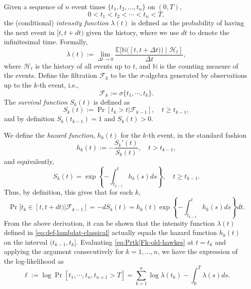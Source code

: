 \documentclass[11pt]{article}
\newcommand{\yao}[1]{\textcolor{cyan}{\textsf{#1}}}
\newcommand{\xc}[1]{\textcolor{orange}{\textsf{XC: #1}}}
\theoremstyle{remark}
\theoremstyle{plain}
\newcommand{\calH}{\mathcal{H}}
\newcommand{\calF}{\mathcal{F}}
\newcommand{\E}{\mathbb{E}}
\begin{document}
Given a sequence of $n$ event times $\{t_1, t_2, \ldots, t_n\}$ on $ (0,T)$,
\[  
0 < t_1 <  t_2 <  \cdots < t_n  < T, 
\]
the (conditional) {\it intensity function} $\lambda(t)$ is defined as the probability of having the next event in $[t, t+dt)$ given the history, where we use $dt$ to denote the infinitesimal time. Formally, 
\begin{equation}\label{eq:def-lambdat-classical}
 \lambda( t ) := \lim _{\Delta t \rightarrow 0} \frac{ \E[ \mathbb{N}( [t, t+\Delta t) ) \mid \mathcal{H}_{t} ]}{\Delta t},   
\end{equation}
where $\calH_t $ is the history of all events up to $t$, 
and  $ \mathbb{N}$ is the counting measure of the events. 
%
Define the filtration $\calF_k$ to be the $\sigma$-algebra generated by observations up to the $k$-th event, i.e.,
\begin{equation}\label{eq:def-calFk}
    \calF_k :=  \sigma\{ t_1, \cdots, t_k \}.
\end{equation}
The {\it survival function} $S_k(t)$ is defined as
\begin{equation}\label{eq:def-Sk-old-hawkes}
    S_k(t) := \Pr [ t_k > t | {\calF}_{k-1}], \quad t \ge t_{k-1}, 
\end{equation}
and by definition $S_k(t_{k-1}) = 1$ and $S_k(t) > 0$. 

We define the {\it hazard function}, $ h_k(t)$ for the $k$-th event, in the standard fashion
\begin{equation}\label{eq:def-hk-old-hawkes}
    h_k(t) := -  \frac{S_k'(t)}{S_k(t)},  
    \quad t > t_{k-1}, 
\end{equation}
and equivalently, 
\[
S_k(t) = \exp\left\{ - \int_{t_{k-1}}^t  h_k(s) ds\right\},  
\quad  t  \ge t_{k-1}.
\]
Thus, by definition, this gives that for each $k$, 
\begin{equation}\label{eq:Prtk|Fk-old-hawkes}
\Pr [ t_k \in [t, t+dt) | \calF_{k-1}] 
= - d S_k(t)   
= h_k(t) \exp\left\{ - \int_{t_{k-1}}^{t}  h_k(s) ds\right\}  dt.
\end{equation}
From the above derivation, it can be shown that the intensity function $\lambda(t)$ defined in \eqref{eq:def-lambdat-classical}
actually equals the hazard function $h_k(t)$ on the interval $(t_{k-1}, t_k]$. 
Evaluating \eqref{eq:Prtk|Fk-old-hawkes} at $t = t_k$
and applying the argument consecutively for $k=1, \ldots, n$,
we have the expression of the log-likelihood as
\[
\ell := \log \Pr[ t_1, \cdots, t_n, t_{n+1}>T]
= \sum_{k=1}^n \log \lambda(t_k) - \int_0^T \lambda(s) ds.
\]
\end{document}

